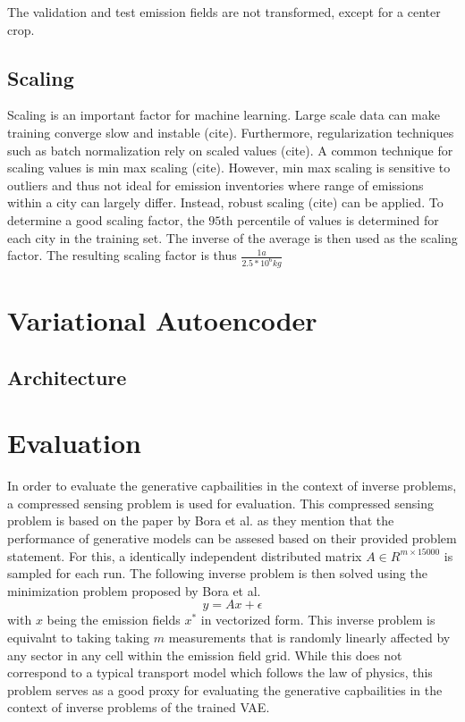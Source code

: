 The validation and test emission fields are not transformed, except for a center crop.

\subsection{Scaling}
Scaling is an important factor for machine learning.
Large scale data can make training converge slow and instable (cite).
Furthermore, regularization techniques such as batch normalization rely on scaled values (cite).
A common technique for scaling values is min max scaling (cite).
However, min max scaling is sensitive to outliers and thus not ideal for emission inventories where range of emissions within a city can largely differ.
Instead, robust scaling (cite) can be applied.
To determine a good scaling factor, the $95$th percentile of values is determined for each city in the training set.
The inverse of the average is then used as the scaling factor.
The resulting scaling factor is thus $\frac{1 a}{2.5 * 10^6 kg}$

\section{Variational Autoencoder}

\subsection{Architecture}

\section{Evaluation}
In order to evaluate the generative capbailities in the context of inverse problems, a compressed sensing problem is used for evaluation.
This compressed sensing problem is based on the paper by Bora et al. as they mention that the performance of generative models can be assesed based on their provided problem statement.
For this, a identically independent distributed matrix $A \in R^{m \times 15000}$ is sampled for each run.
The following inverse problem is then solved using the minimization problem proposed by Bora et al.
\begin{equation}
    y = A x + \epsilon
\end{equation}
with $x$ being the emission fields $x^*$ in vectorized form.
This inverse problem is equivalnt to taking taking $m$ measurements that is randomly linearly affected by any sector in any cell within the emission field grid.
While this does not correspond to a typical transport model which follows the law of physics, this problem serves as a good proxy for evaluating the generative capbailities in the context of inverse problems of the trained VAE. 

